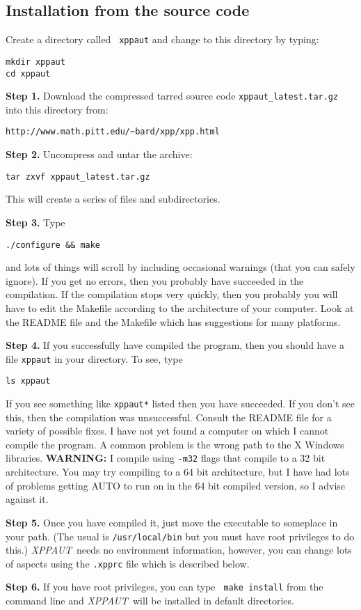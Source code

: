\documentclass{article}
\newcommand{\XPP}{{\sl XPPAUT\, }}
\begin{document}
\subsection{Installation from the source code}
\begin{description}
\item Create a directory called {\tt
xppaut} and change to this directory by typing:
\begin{verbatim}
mkdir xppaut
cd xppaut
\end{verbatim}
\item{\bf Step 1.} Download the compressed tarred
source code {\tt xppaut\_latest.tar.gz} into this directory
 from:
\begin{verbatim}
http://www.math.pitt.edu/~bard/xpp/xpp.html
\end{verbatim}

\item{\bf Step 2.} Uncompress and untar the archive:
\begin{verbatim}
tar zxvf xppaut_latest.tar.gz
\end{verbatim}
This will create a series of files and subdirectories.
\item{\bf Step 3.}  Type
\begin{verbatim}
./configure && make
\end{verbatim}
and lots of things will scroll by including occasional warnings (that
you
can safely ignore).  If you get no errors, then you probably have
succeeded in the compilation. If the compilation stops very quickly,
then you probably you will have to edit the Makefile according to the
architecture of your computer.  Look at the README file and the
Makefile which has suggestions for many platforms.
\item{\bf Step 4.} If you successfully have compiled the program, then
you should have a
file {\tt xppaut} in your directory. To see, type
\begin{verbatim}
ls xppaut
\end{verbatim}
If you see something like {\tt xppaut*} listed then you have
succeeded. If you don't see this, then the compilation was
unsuccessful. Consult the README file for a variety of possible
fixes.
I have not yet found a computer on which I cannot compile the
program. A common problem is the wrong path to the X Windows
libraries. {\bf WARNING:} I compile using {\tt -m32} flags that
compile to a 32 bit architecture. You may try compiling to a 64 bit
architecture, but I have had lots of problems getting AUTO to run on
in the 64 bit compiled version, so I advise against it.
\item{\bf Step 5.} Once you have
compiled it, just move the executable to someplace in your path. (The
usual is {\tt /usr/local/bin} but you must have root privileges to do
this.) \XPP needs no environment information, however, you can change
lots of aspects using the  {\tt .xpprc} file which is described below.
\item {\bf Step 6.}  If you have root privileges, you can type {\tt
make install} from the command line and \XPP will be installed in
default directories.
\end{description}
\end{document}
